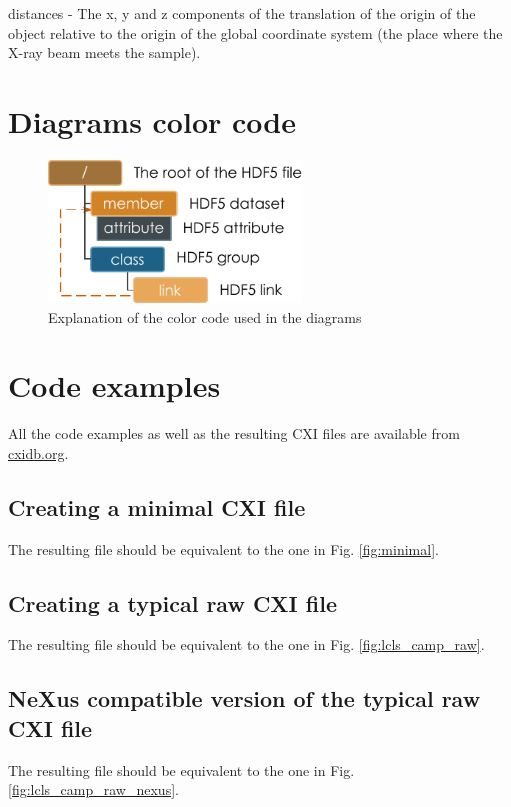 \documentclass[usletter,11pt]{article}
\newcommand{\member}[2]
{ \noindent
{ \color{softBlue}  #1 - } #2
\vspace{0.2cm}
}
\begin{document}
\member{distances}{The x, y and z components of the translation of the origin of the object
  relative to the origin of the global coordinate system (the place
  where the X-ray beam meets the sample).}
\normalsize

\clearpage
\section{Diagrams color code}
\label{color_code}

\begin{figure}[h!]
\centering
\includegraphics[width=0.6\textwidth]{diagram_labels.pdf}
\caption{Explanation of the color code used in the diagrams}
\label{fig:color_code}
\end{figure}

\clearpage
\section{Code examples}

All the code examples as well as the resulting CXI files are available from \url{cxidb.org}.
 
\subsection{Creating a minimal CXI file}

The resulting file should be equivalent to the one in
Fig. \ref{fig:minimal}.

\clearpage
\subsection{Creating a typical raw CXI file}

The resulting file should be equivalent to the one in
Fig. \ref{fig:lcls_camp_raw}.

\clearpage
\subsection{NeXus compatible version of the typical raw CXI file}

The resulting file should be equivalent to the one in
Fig. \ref{fig:lcls_camp_raw_nexus}.
\end{document}
